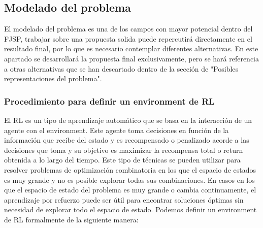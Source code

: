 \subsection{Modelado del problema}
El modelado del problema es una de los campos con mayor potencial dentro del FJSP, trabajar sobre una 
propuesta solida puede repercutirá directamente en el resultado final, por lo que es necesario
contemplar diferentes alternativas. En este apartado se desarrollará la propuesta final exclusivamente,
pero se hará referencia a otras alternativas que se han descartado dentro de la sección de "Posibles
representaciones del problema".

\subsubsection{Procedimiento para definir un environment de RL}
El RL es un tipo de aprendizaje automático que se basa en la interacción de un agente con el environment. 
Este agente toma decisiones en función de la información que recibe del estado y es recompensado 
o penalizado acorde a las decisiones que toma y su objetivo es maximizar la recompensa total o return
obtenida a lo largo del tiempo. Este tipo de técnicas se pueden utilizar para resolver problemas de optimización 
combinatoria en los que el espacio de estados es muy grande y no es posible explorar todas sus combinaciones. 
En casos en los que el espacio de estado del problema es muy grande o cambia continuamente,
el aprendizaje por refuerzo puede ser útil para encontrar soluciones óptimas sin necesidad de
explorar todo el espacio de estado. Podemos definir un environment de RL formalmente de la siguiente manera:

